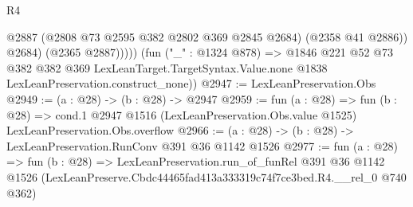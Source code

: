 \begin{lexlean}{R4}
\begin{coremodule}
                  @2887
                  (@2808 @73 @2595 @382 @2802 @369 @2845 @2684)
                  (@2358 @41 @2886))
                @2684)
              (@2365 @2887)))))
      (fun ("_" : @1324 @878) =>
      @1846
        @221
        @52
        @73
        @382
        @382
        @369
        LexLeanTarget.TargetSyntax.Value.none
        @1838
        LexLeanPreservation.construct_none))
@2947 := LexLeanPreservation.Obs
@2949 := (a : @28) -> (b : @28) -> @2947
@2959 := fun (a : @28) =>
  fun (b : @28) =>
  cond.{1} @2947 @1516 (LexLeanPreservation.Obs.value @1525) LexLeanPreservation.Obs.overflow
@2966 := (a : @28) -> (b : @28) -> LexLeanPreservation.RunConv @391 @36 @1142 @1526
@2977 := fun (a : @28) =>
  fun (b : @28) =>
  LexLeanPreservation.run_of_funRel
    @391
    @36
    @1142
    @1526
    (LexLeanPreserve.Cbdc44465fad413a333319c74f7ce3bed.R4.__rel_0 @740 @362)
\end{coremodule}
\end{lexlean}
